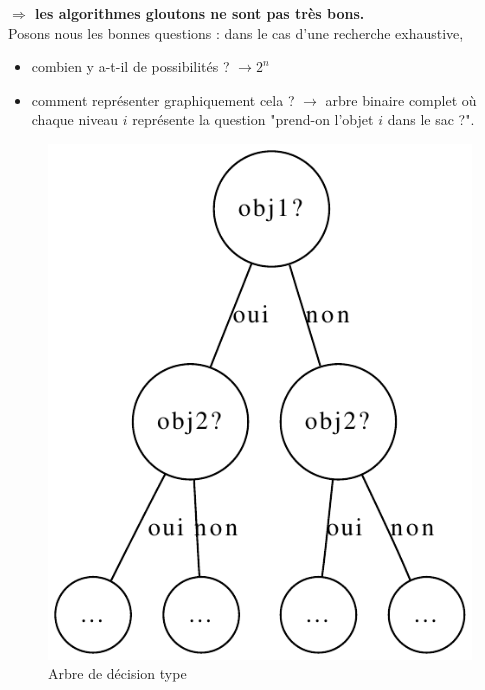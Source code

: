 \documentclass[12pt]{article}
\begin{document}
\textbf{$\Rightarrow$ les algorithmes gloutons ne sont pas très bons.} \\

\noindent Posons nous les bonnes questions : dans le cas d'une recherche exhaustive,
\begin{itemize}
\item combien y a-t-il de possibilités ? $\rightarrow 2^n$
\item comment représenter graphiquement cela ? $\rightarrow$ arbre binaire complet où chaque niveau $i$ représente la question "prend-on
l'objet $i$ dans le sac ?".
\end{itemize}

\begin{figure}[h!]
    \begin{center}
    \includegraphics[scale=0.5]{arbredec1.pdf}
    \caption{Arbre de décision type}
    \end{center}
\end{figure}
\end{document}
